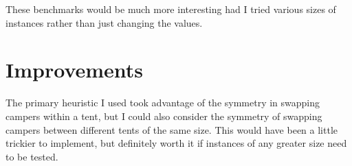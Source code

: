 \documentclass{article}
\begin{document}
These benchmarks would be much more interesting had I tried various sizes of instances rather than just changing the values.

\section{Improvements}
The primary heuristic I used took advantage of the symmetry in swapping campers within a tent, but I could also consider the symmetry of swapping campers between different tents of the same size. This would have been a little trickier to implement, but definitely worth it if instances of any greater size need to be tested.
\end{document}

